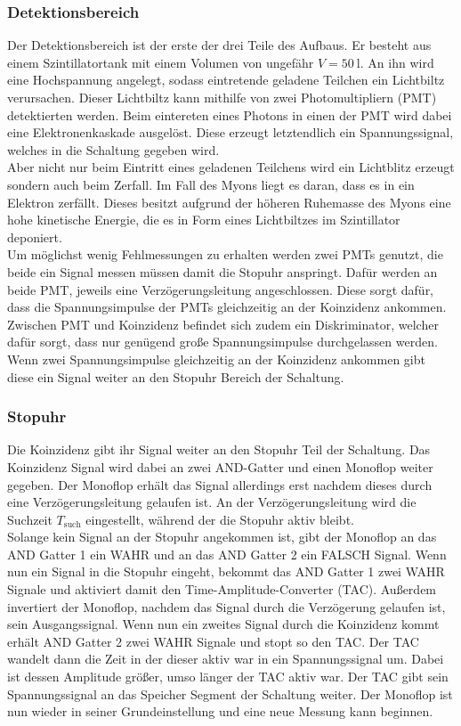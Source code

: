 \subsubsection{Detektionsbereich}
Der Detektionsbereich ist der erste der drei Teile des Aufbaus.
Er besteht aus einem Szintillatortank mit einem Volumen von ungefähr $V = \SI{50}{\litre}$.
An ihn wird eine Hochspannung angelegt, sodass eintretende geladene Teilchen ein Lichtbiltz verursachen.
Dieser Lichtbiltz kann mithilfe von zwei Photomultipliern (PMT) detektierten werden.
Beim eintereten eines Photons in einen der PMT wird dabei eine Elektronenkaskade ausgelöst.
Diese erzeugt letztendlich ein Spannungssignal, welches in die Schaltung gegeben wird.\\
Aber nicht nur beim Eintritt eines geladenen Teilchens wird ein Lichtblitz erzeugt sondern auch beim Zerfall.
Im Fall des Myons liegt es daran, dass es in ein Elektron zerfällt.
Dieses besitzt aufgrund der höheren Ruhemasse des Myons eine hohe kinetische Energie, die es in Form eines Lichtbiltzes im Szintillator deponiert.\\
Um möglichst wenig Fehlmessungen zu erhalten werden zwei PMTs genutzt, die beide ein Signal messen müssen damit die Stopuhr anspringt.
Dafür werden an beide PMT, jeweils eine Verzögerungsleitung angeschlossen.
Diese sorgt dafür, dass die Spannungsimpulse der PMTs gleichzeitig an der Koinzidenz ankommen.
Zwischen PMT und Koinzidenz befindet sich zudem ein Diskriminator, welcher dafür sorgt, dass nur genügend große Spannungsimpulse durchgelassen werden.
Wenn zwei Spannungsimpulse gleichzeitig an der Koinzidenz ankommen gibt diese ein Signal weiter an den Stopuhr Bereich der Schaltung.
\subsubsection{Stopuhr}
Die Koinzidenz gibt ihr Signal weiter an den Stopuhr Teil der Schaltung.
Das Koinzidenz Signal wird dabei an zwei AND-Gatter und einen Monoflop weiter gegeben.
Der Monoflop erhält das Signal allerdings erst nachdem dieses durch eine Verzögerungsleitung gelaufen ist.
An der Verzögerungsleitung wird die Suchzeit $T_\text{such}$ eingestellt, während der die Stopuhr aktiv bleibt.\\
Solange kein Signal an der Stopuhr angekommen ist, gibt der Monoflop an das AND Gatter 1 ein WAHR und an das AND Gatter 2 ein FALSCH Signal.
Wenn nun ein Signal in die Stopuhr eingeht, bekommt das AND Gatter 1 zwei WAHR Signale und aktiviert damit den Time-Amplitude-Converter (TAC).
Außerdem invertiert der Monoflop, nachdem das Signal durch die Verzögerung gelaufen ist, sein Ausgangssignal.
Wenn nun ein zweites Signal durch die Koinzidenz kommt erhält AND Gatter 2 zwei WAHR Signale und stopt so den TAC.
Der TAC wandelt dann die Zeit in der dieser aktiv war in ein Spannungssignal um.
Dabei ist dessen Amplitude größer, umso länger der TAC aktiv war.
Der TAC gibt sein Spannungssignal an das Speicher Segment der Schaltung weiter.
Der Monoflop ist nun wieder in seiner Grundeinstellung und eine neue Messung kann beginnen.
